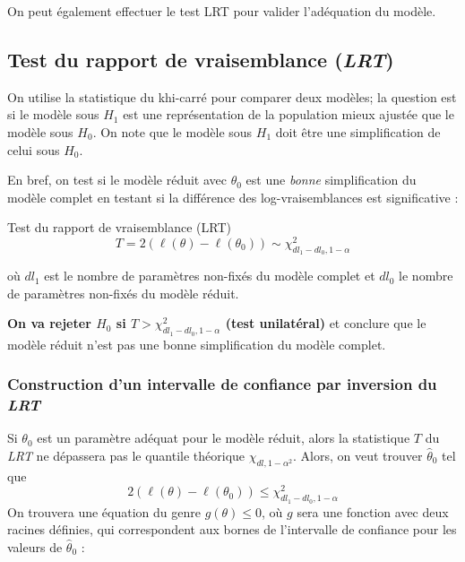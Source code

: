 \documentclass[10pt, french]{article}
\begin{document}
\begin{multicols*}{3}
On peut également effectuer le test LRT pour valider l'adéquation du modèle.

\subsection*{Test du rapport de vraisemblance (\emph{LRT})}
On utilise la statistique du khi-carré pour comparer deux modèles; la question est si le modèle sous $H_{1}$ est une représentation de la population mieux ajustée que le modèle sous $H_{0}$. 
On note que le modèle sous $H_{1}$ doit être une simplification de celui sous $H_{0}$.

En bref, on test si le modèle réduit avec $\theta_0$ est une \emph{bonne} simplification du modèle complet en testant si la différence des log-vraisemblances est significative : 
\begin{algo}{Test du rapport de vraisemblance (LRT)}
\[
	T 
	= 		2 \left( \ell(\theta) - \ell(\theta_0) \right)
	\sim		\chi_{dl_1 - dl_0, 1 - \alpha}^2
\]
\end{algo}
où $dl_1$ est le nombre de paramètres non-fixés du modèle complet et $dl_0$ le nombre de paramètres non-fixés du modèle réduit. 

\textbf{On va rejeter $H_0$ si $T >\chi_{dl_1 - dl_0, 1-\alpha}^2 $ (test unilatéral)} et conclure que le modèle réduit n'est pas une bonne simplification du modèle complet.

\subsubsection*{Construction d'un intervalle de confiance par inversion du \emph{LRT}}
Si $\theta_0$ est un paramètre adéquat pour le modèle réduit, alors la statistique $T$ du \emph{LRT} ne dépassera pas le quantile théorique $\chi_{dl, 1- \alpha^2}$. 
Alors, on veut trouver $\hat{\theta}_0$ tel que
\[2 \left( \ell(\theta) - \ell(\theta_0) \right) \leq  \chi_{dl_1 - dl_0, 1-\alpha}^2\]
On trouvera une équation du genre $g(\theta) \leq 0$, où $g$ sera une fonction avec deux racines définies, qui correspondent aux bornes de l'intervalle de confiance pour les valeurs de $\hat{\theta}_0$ : 


\end{multicols*}
\end{document}
